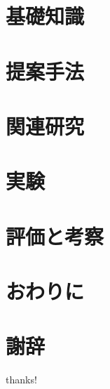 \documentclass[a4paper,12pt]{jsreport}
\begin{document}
\chapter{基礎知識}
\chapter{提案手法}
\chapter{関連研究}
\chapter{実験}
\chapter{評価と考察}
\chapter{おわりに}
\chapter*{謝辞}
thanks!

\newpage
\renewcommand{\bibname}{参考文献}
\begin{thebibliography}{2}
\end{thebibliography}

\newpage
\end{document}
